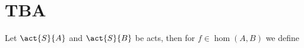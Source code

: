 \clearpage
\section{TBA}
Let $\act{S}{A}$ and $\act{S}{B}$ be acts, then for $f\in\hom (A,B)$
we define 